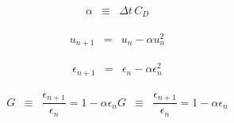 \documentclass[10pt,twoside,a4paper]{extarticle}
\begin{document}
\raggedbottom

\begin{eqnarray}
\alpha & \equiv & \Delta t\,C_D
\end{eqnarray}

\begin{eqnarray}
u_{n+1} & = & u_n - \alpha u_n^2
\end{eqnarray}

\begin{eqnarray}
\epsilon_{n+1} & = & \epsilon_n - \alpha \epsilon_n^2
\end{eqnarray}

\begin{eqnarray}
G & \equiv & \dfrac{\epsilon_{n+1}}{\epsilon_n} = 1 - \alpha \epsilon_n
G & \equiv & \dfrac{\epsilon_{n+1}}{\epsilon_n} = 1 - \alpha \epsilon_n
\end{eqnarray}
\end{document}
